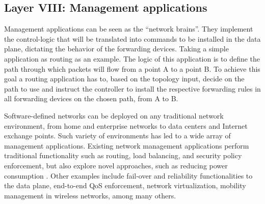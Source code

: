 \subsection{Layer VIII: Management applications}

Management applications can be seen as the ``network brains''. 
They implement the control-logic that will be translated into commands to be installed in the data plane, dictating the behavior of the forwarding devices.
Taking a simple application as routing as an example. 
The logic of this application is to define the path through which packets will flow from 
a point A to a point B.
To achieve this goal a routing application has to, based on the topology input, decide on the path to use and instruct the controller to install the 
respective forwarding rules in all forwarding devices on the chosen path, from A to B.

Software-defined networks can be deployed on any traditional network environment, from home and enterprise networks to data centers and Internet exchange points.
Such variety of environments has led to a wide array of management applications.
Existing network management applications perform traditional functionality such as routing, load balancing, and security policy enforcement, but also explore novel approaches, such as reducing power consumption . 
Other examples include fail-over and reliability functionalities to the data plane, end-to-end QoS enforcement, network virtualization, mobility management in wireless networks, among many others.

%

